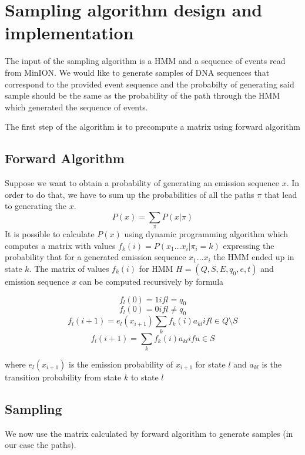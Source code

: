 \chapter{Sampling algorithm design and implementation}

The input of the sampling algorithm is a HMM and a sequence of events read from MinION.
We would like to generate samples of DNA sequences that correspond to the provided event sequence
and the probabilty of generating said sample should be the same as the probability of the path
through the HMM which generated the sequence of events.

The first step of the algorithm is to precompute a matrix using forward algorithm

\section{Forward Algorithm}

Suppose we want to obtain a probability of generating an emission sequence $x$. In order to do that, we
have to sum up the probabilities of all the paths $\pi$ that lead to generating the $x$.
$$P(x) = \sum_{\pi}{P(x | \pi)}$$
It is possible to calculate $P(x)$ using dynamic programming algorithm which computes a matrix with values
$f_k(i) = P(x_1 \dots x_i | \pi_i = k)$ expressing the probability that for a generated emission sequence $x_1 \dots x_i$
the HMM ended up in state $k$.
The matrix of values $f_k(i)$ for HMM $H = (Q,S,E,q_0,e,t)$ and emission sequence $x$ can be computed recursively by formula

$$f_l(0) = 1 if l = q_0$$
$$f_l(0) = 0 if l \neq q_0$$
$$f_l(i+1) = e_l(x_{i+1}) \sum_{k}{f_k(i)a_{kl}} if l \in Q \setminus S$$
$$f_l(i+1) = \sum_{k}{f_k(i)a_{kl}} if u \in S$$

where $e_l(x_{i+1})$ is the emission probability of $x_{i+1}$ for state $l$ and $a_{kl}$ is the transition probability from
state $k$ to state $l$

\section{Sampling}

We now use the matrix calculated by forward algorithm to generate samples (in our case the paths).

